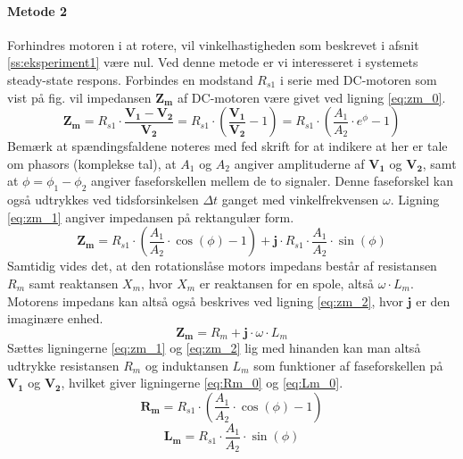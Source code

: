 \paragraph{Metode 2}
Forhindres motoren i at rotere, vil vinkelhastigheden som beskrevet i afsnit \ref{ss:eksperiment1} være nul.
Ved denne metode er vi interesseret i systemets steady-state respons.
Forbindes en modstand \(R_{s1}\) i serie med DC-motoren som vist på fig. %
vil impedansen \(\mathbf{Z_m}\) af DC-motoren være givet ved ligning \ref{eq:zm_0}.
\begin{equation}
	\mathbf{Z_m}=R_{s1}\cdot\frac{\mathbf{V_1}-\mathbf{V_2}}{\mathbf{V_2}}
			=R_{s1}\cdot\left(\frac{\mathbf{V_1}}{\mathbf{V_2}}-1\right)
			=R_{s1}\cdot\left(\frac{A_1}{A_2}\cdot{e}^{\phi}-1\right)
	\label{eq:zm_0} 
 \end{equation}
Bemærk at spændingsfaldene noteres med fed skrift for at indikere at her er tale om phasors (komplekse tal),
at \(A_1\) og \(A_2\) angiver amplituderne af \(\mathbf{V_1}\) og \(\mathbf{V_2}\),
samt at \(\phi=\phi_1-\phi_2\) angiver faseforskellen mellem de to signaler.
Denne faseforskel kan også udtrykkes ved tidsforsinkelsen \(\Delta{t}\) ganget med vinkelfrekvensen \(\omega\).
Ligning \ref{eq:zm_1} angiver impedansen på rektangulær form.
\begin{equation}
	\mathbf{Z_m}=R_{s1}\cdot\left(\frac{A_1}{A_2}\cdot{\cos (\phi)}-1\right)	%
	+\mathbf{j}\cdot{R_{s1}}\cdot\frac{A_1}{A_2}\cdot\sin(\phi)	%
	\label{eq:zm_1} 
 \end{equation}
Samtidig vides det, at den rotationslåse motors impedans består af resistansen \(R_m\) samt
reaktansen \(X_m\), hvor \(X_m\) er reaktansen for en spole, altså \(\omega\cdot{L_m}\).
Motorens impedans kan altså også beskrives ved ligning \ref{eq:zm_2}, hvor \(\mathbf{j}\) er den imaginære enhed.
\begin{equation}
	\mathbf{Z_m}=R_m+\mathbf{j}\cdot\omega\cdot{L_m}
	\label{eq:zm_2} 
 \end{equation}
Sættes ligningerne \ref{eq:zm_1} og \ref{eq:zm_2} lig med hinanden
kan man altså udtrykke resistansen \(R_m\) og induktansen \(L_m\) som funktioner
af faseforskellen på \(\mathbf{V_1}\) og \(\mathbf{V_2}\),
hvilket giver ligningerne \ref{eq:Rm_0} og \ref{eq:Lm_0}.
\begin{equation}
	\mathbf{R_m}=R_{s1}\cdot\left(\frac{A_1}{A_2}\cdot{\cos (\phi)}-1\right)
	\label{eq:Rm_0} 
 \end{equation}
\begin{equation}
	\mathbf{L_m}=R_{s1}\cdot\frac{A_1}{A_2}\cdot\sin(\phi)
	\label{eq:Lm_0} 
 \end{equation}


